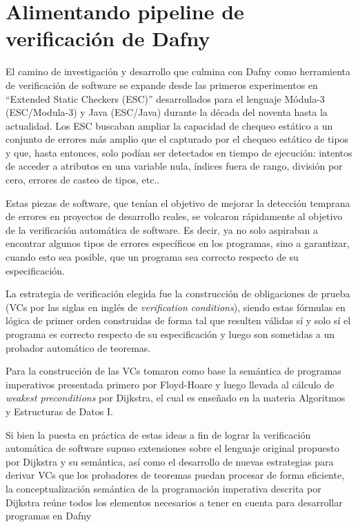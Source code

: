 \documentclass[12pt, a4paper, openany, fleqn]{book}
\begin{document}
    \section{Alimentando pipeline de verificación de Dafny}

    El camino de investigación y desarrollo que culmina con Dafny como herramienta de verificación de software se expande desde las primeros experimentos en ``Extended Static Checkers (ESC)'' desarrollados para el lenguaje Módula-3 (ESC/Modula-3) y Java (ESC/Java) durante la década del noventa hasta la actualidad. Los ESC buscaban ampliar la capacidad de chequeo estático a un conjunto de errores más amplio que el capturado por el chequeo estático de tipos y que, hasta entonces, solo podían ser detectados en tiempo de ejecución: intentos de acceder a atributos en una variable nula, índices fuera de rango, división por cero, errores de casteo de tipos, etc.\cite{Leino2001}.

    Estas piezas de software, que tenían el objetivo de mejorar la detección temprana de errores en proyectos de desarrollo reales, se volcaron rápidamente al objetivo de la verificación automática de software. Es decir, ya no solo aspiraban a encontrar algunos tipos de errores específicos en los programas, sino a garantizar, cuando esto sea posible, que un programa sea correcto respecto de su especificación.

    La estrategia de verificación elegida fue la construcción de obligaciones de prueba (VCs por las siglas en inglés de \textit{verification conditions}), siendo estas fórmulas en lógica de primer orden construidas de forma tal que resulten válidas sí y solo sí el programa es correcto respecto de su especificación y luego son sometidas a un probador automático de teoremas.

    Para la construcción de las VCs tomaron como base la semántica de programas imperativos presentada primero por Floyd-Hoare y luego llevada al cálculo de \textit{weakest preconditions} por Dijkstra, el cual es enseñado en la materia Algoritmos y Estructuras de Datos I.

    Si bien la puesta en práctica de estas ideas a fin de lograr la verificación automática de software supuso extensiones sobre el lenguaje original propuesto por Dijkstra y su semántica, así como el desarrollo de nuevas estrategias para derivar VCs que los probadores de teoremas puedan procesar de forma eficiente, la conceptualización semántica de la programación imperativa descrita por Dijkstra reúne todos los elementos necesarios a tener en cuenta para desarrollar programas en Dafny
\end{document}
